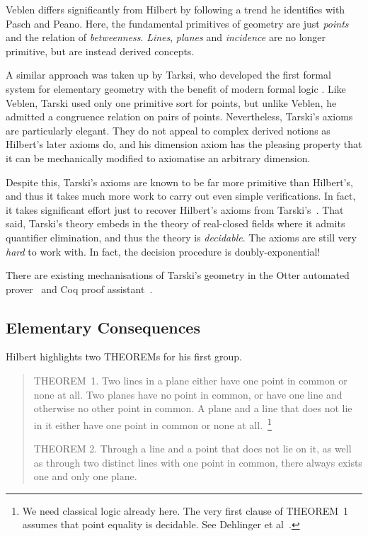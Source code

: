 Veblen differs significantly from Hilbert by following a trend he identifies with Pasch and Peano. Here, the fundamental primitives of geometry are just \emph{points} and the relation of \emph{betweenness}. \emph{Lines}, \emph{planes} and \emph{incidence} are no longer primitive, but are instead derived concepts.

A similar approach was taken up by Tarksi, who developed the first formal system for elementary geometry with the benefit of modern formal logic \cite{TarskiGeometrySystem}. Like Veblen, Tarski used only one primitive sort for points, but unlike Veblen, he admitted a congruence relation on pairs of points. Nevertheless, Tarski's axioms are particularly elegant. They do not appeal to complex derived notions as Hilbert's later axioms do, and his dimension axiom has the pleasing property that it can be mechanically modified to axiomatise an arbitrary dimension.

Despite this, Tarski's axioms are known to be far more primitive than Hilbert's, and thus it takes much more work to carry out even simple verifications. In fact, it takes significant effort just to recover Hilbert's axioms from Tarski's~\cite{NarbouxTarskiHilbert}. That said, Tarski's theory embeds in the theory of real-closed fields where it admits quantifier elimination, and thus the theory is \emph{decidable}. The axioms are still very \emph{hard} to work with. In fact, the decision procedure is doubly-exponential!

There are existing mechanisations of Tarski's geometry in the Otter automated prover~\cite{QuaifeTarski} and Coq proof assistant~\cite{NarbouxTarski}.

\subsection{Elementary Consequences}
Hilbert highlights two THEOREMs for his first group.

\begin{quotation}
  THEOREM~1. Two lines in a plane either have one point in common or none at all. Two planes have no point in common, or have one line and otherwise no other point in common. A plane and a line that does not lie in it either have one point in common or none at all.~\footnote{We need classical logic already here. The very first clause of THEOREM~1 assumes that point equality is decidable. See Dehlinger et al~\cite{DehlingerFOG}.}

  THEOREM 2. Through a line and a point that does not lie on it, as well as through two distinct lines with one point in common, there always exists one and only one plane.
\end{quotation}

